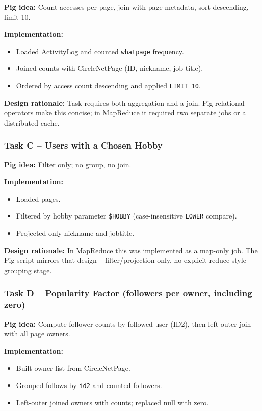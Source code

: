 \documentclass[11pt]{article}
\begin{document}
\textbf{Pig idea:} Count accesses per page, join with page metadata, sort descending, limit 10.

\textbf{Implementation:}
\begin{itemize}[noitemsep,topsep=2pt]
  \item Loaded ActivityLog and counted \texttt{whatpage} frequency.
  \item Joined counts with CircleNetPage (ID, nickname, job title).
  \item Ordered by access count descending and applied \texttt{LIMIT 10}.
\end{itemize}

\textbf{Design rationale:} Task requires both aggregation and a join. Pig relational operators make this concise; in MapReduce it required two separate jobs or a distributed cache.

\subsubsection*{Task C -- Users with a Chosen Hobby}

\textbf{Pig idea:} Filter only; no group, no join.

\textbf{Implementation:}
\begin{itemize}[noitemsep,topsep=2pt]
  \item Loaded pages.
  \item Filtered by hobby parameter \texttt{\$HOBBY} (case-insensitive \texttt{LOWER} compare).
  \item Projected only nickname and jobtitle.
\end{itemize}

\textbf{Design rationale:} In MapReduce this was implemented as a map-only job. The Pig script mirrors that design -- filter/projection only, no explicit reduce-style grouping stage.

\subsubsection*{Task D -- Popularity Factor (followers per owner, including zero)}

\textbf{Pig idea:} Compute follower counts by followed user (ID2), then left-outer-join with all page owners.

\textbf{Implementation:}
\begin{itemize}[noitemsep,topsep=2pt]
  \item Built owner list from CircleNetPage.
  \item Grouped follows by \texttt{id2} and counted followers.
  \item Left-outer joined owners with counts; replaced null with zero.
\end{itemize}
\end{document}
